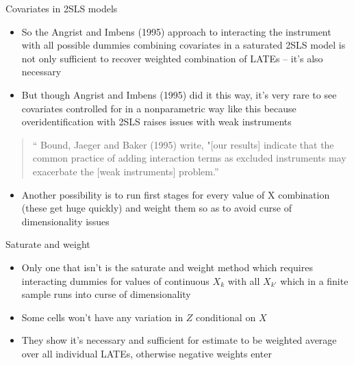 \documentclass{beamer}
\begin{document}
\begin{frame}{Covariates in 2SLS models}

  \begin{itemize}
    \item So the Angrist and Imbens (1995) approach to interacting the instrument with all possible dummies combining covariates in a saturated 2SLS model is not only sufficient to recover weighted combination of LATEs -- it's also necessary
    \item But though Angrist and Imbens (1995) did it this way, it's very rare to see covariates controlled for in a nonparametric way like this because overidentification with 2SLS raises issues with weak instruments
  \end{itemize}

  \begin{quote}
    `` Bound, Jaeger and Baker (1995) write, "[our results] indicate that the common practice of adding interaction terms as excluded instruments may exacerbate the [weak instruments] problem.''
  \end{quote}
  \begin{itemize}
    \item Another possibility is to run first stages for every value of X combination (these get huge quickly) and weight them so as to avoid curse of dimensionality issues
  \end{itemize}

\end{frame}



\begin{frame}{Saturate and weight}

  \begin{itemize}
    \item Only one that isn't is the saturate and weight method which requires interacting dummies for values of continuous $X_k$ with all $X_{k'}$ which in a finite sample runs into curse of dimensionality
    \item Some cells won't have any variation in $Z$ conditional on $X$
    \item They show it's necessary and sufficient for estimate to be weighted average over all individual LATEs, otherwise negative weights enter
  \end{itemize}

\end{frame}
\end{document}
